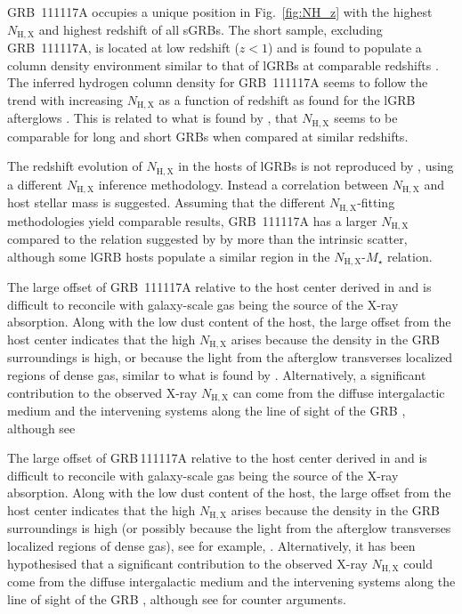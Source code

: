 \documentclass{aa}    %
\begin{document}
GRB~111117A occupies a unique position in Fig.~\ref{fig:NH_z} with the highest
$N_\mathrm{H,X}$ and highest redshift of all sGRBs. The short sample, excluding
GRB~111117A, is located at low redshift ($z < 1$) and is found to populate a
column density environment similar to that of lGRBs at comparable redshifts
\citep{DAvanzo2014a}. The inferred hydrogen column density for GRB~111117A seems
to follow the trend with increasing $N_\mathrm{H,X}$ as a function of redshift as found for
the lGRB afterglows \citep{Campana2010, Starling2013, Arcodia2016}. This is
related to what is found by \citet{Kopac2012, Margutti2013}, that $N_\mathrm{H,X}$ seems to
be comparable for long and short GRBs when compared at similar redshifts.

The redshift evolution of $N_\mathrm{H,X}$ in the hosts of lGRBs is not
reproduced by \citet{Buchner2017}, using a different $N_\mathrm{H,X}$ inference
methodology. Instead a correlation between $N_\mathrm{H,X}$ and host stellar
mass is suggested. Assuming that the different $N_\mathrm{H,X}$-fitting
methodologies yield comparable results, GRB~111117A has a larger
$N_\mathrm{H,X}$ compared to the relation suggested by \citet{Buchner2017} by
more than the intrinsic scatter, although some lGRB hosts populate a similar
region in the $N_\mathrm{H,X}$-$M_\star$ relation.

The large offset of GRB~111117A relative to the host center derived in
\citet{Margutti2012} and \citet{Sakamoto2013} is difficult to reconcile with
galaxy-scale gas being the source of the X-ray absorption. Along with the low
dust content of the host, the large offset from the host center indicates that
the high $N_\mathrm{H,X}$ arises because the density in the GRB surroundings is
high, or because the light from the afterglow transverses localized regions of
dense gas, similar to what is found by \citep{}. Alternatively, a significant
contribution to the observed X-ray $N_\mathrm{H,X}$ can come from the diffuse
intergalactic medium and the intervening systems along the line of sight of the
GRB \citep{Campana2012, Arcodia2016}, although see \citep{}

The large offset of GRB\,111117A relative to the host center derived in
\citet{Margutti2012} and \citet{Sakamoto2013} is difficult to reconcile with
galaxy-scale gas being the source of the X-ray absorption. Along with the low
dust content of the host, the large offset from the host center indicates that
the high $N_\mathrm{H,X}$ arises because the density in the GRB surroundings is
high (or possibly because the light from the afterglow transverses localized
regions of dense gas), see for example,
\citep[e.g.][]{Galama1998,Watson2013,Krongold2013}. Alternatively, it has been
hypothesised that a significant contribution to the observed X-ray
$N_\mathrm{H,X}$ could come from the diffuse intergalactic medium and the
intervening systems along the line of sight of the GRB \citep{Campana2012,
	Arcodia2016}, although see \citep{Watson2013, Krongold2013} for counter
arguments.
\end{document}
